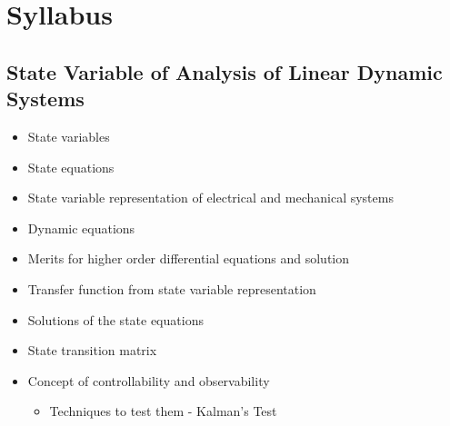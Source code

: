 \documentclass[../course]{subfiles}
\begin{document}
\section{Syllabus}

\subsection{State Variable of Analysis of Linear Dynamic Systems}

\begin{itemize}

    \item State variables
    \item State equations
    \item State variable representation of electrical and mechanical systems
    \item Dynamic equations
    \item Merits for higher order differential equations and solution
    \item Transfer function from state variable representation
    \item Solutions of the state equations
    \item State transition matrix
    \item Concept of controllability and observability

        \begin{itemize}

            \item Techniques to test them - Kalman's Test

        \end{itemize}

\end{itemize}
\end{document}
